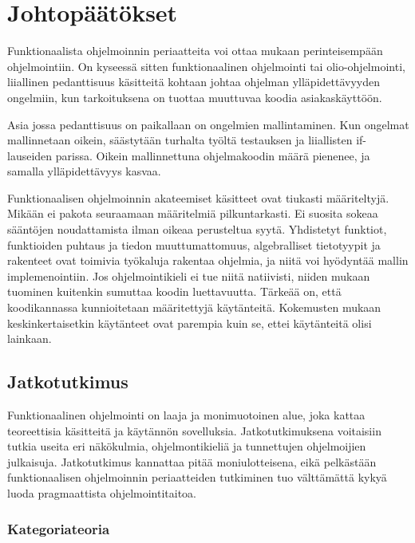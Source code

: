 \vspace{21.5pt}
\chapter{Johtopäätökset}

Funktionaalista ohjelmoinnin periaatteita voi ottaa mukaan perinteisempään ohjelmointiin. On kyseessä sitten funktionaalinen ohjelmointi tai olio-ohjelmointi, liiallinen pedanttisuus käsitteitä kohtaan johtaa ohjelman ylläpidettävyyden ongelmiin, kun tarkoituksena on tuottaa muuttuvaa koodia asiakaskäyttöön.

Asia jossa pedanttisuus on paikallaan on ongelmien mallintaminen. Kun ongelmat mallinnetaan oikein, säästytään turhalta työltä testauksen ja liiallisten if-lauseiden parissa. Oikein mallinnettuna ohjelmakoodin määrä pienenee, ja samalla ylläpidettävyys kasvaa.

Funktionaalisen ohjelmoinnin akateemiset käsitteet ovat tiukasti määriteltyjä. Mikään ei pakota seuraamaan määritelmiä pilkuntarkasti. Ei suosita sokeaa sääntöjen noudattamista ilman oikeaa perusteltua syytä. Yhdistetyt funktiot, funktioiden puhtaus ja tiedon muuttumattomuus, algebralliset tietotyypit ja rakenteet ovat toimivia työkaluja rakentaa ohjelmia, ja niitä voi hyödyntää mallin implemenointiin. Jos ohjelmointikieli ei tue niitä natiivisti, niiden mukaan tuominen kuitenkin sumuttaa koodin luettavuutta. Tärkeää on, että koodikannassa kunnioitetaan määritettyjä käytänteitä. Kokemusten mukaan keskinkertaisetkin käytänteet ovat parempia kuin se, ettei käytänteitä olisi lainkaan.

\section{Jatkotutkimus}

Funktionaalinen ohjelmointi on laaja ja monimuotoinen alue, joka kattaa teoreettisia käsitteitä ja käytännön sovelluksia. Jatkotutkimuksena voitaisiin tutkia useita eri näkökulmia, ohjelmontikieliä ja tunnettujen ohjelmoijien julkaisuja. Jatkotutkimus kannattaa pitää moniulotteisena, eikä pelkästään funktionaalisen ohjelmoinnin periaatteiden tutkiminen tuo välttämättä kykyä luoda pragmaattista ohjelmointitaitoa.


\subsection{Kategoriateoria}

